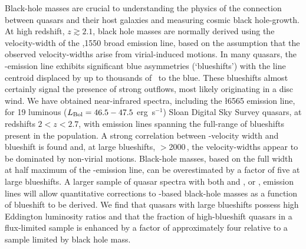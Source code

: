 Black-hole masses are crucial to understanding the physics of the connection between quasars and their host galaxies and measuring cosmic black hole-growth. 
At high redshift, $z \gtrsim 2.1$, black hole masses are normally derived using the velocity-width of the ,1550 broad emission line, based on the assumption that the observed velocity-widths arise from virial-induced motions.  
In many quasars, the -emission line exhibits significant blue asymmetries (`blueshifts') with the line centroid displaced by up to thousands of \kms\, to the blue. 
These blueshifts almost certainly signal the presence of strong outflows, most likely originating in a disc wind.
We have obtained near-infrared spectra, including the \ha\l6565 emission line, for 19 luminous ($L_{\rm Bol} = 46.5-47.5$ erg~s$^{-1}$) Sloan Digital Sky Survey quasars, at redshifts $2 < z < 2.7$, with  emission lines spanning the full-range of blueshifts present in the population.  
A strong correlation between -velocity width and blueshift is found and, at large blueshifts, $>$2000\,\kms, the velocity-widths appear to be dominated by non-virial motions. 
Black-hole masses, based on the full width at half maximum of the -emission line, can be overestimated by a factor of five at large blueshifts. 
A larger sample of quasar spectra with both  and \hbns, or \hans, emission lines will allow quantitative corrections to -based black-hole masses as a function of blueshift to be derived. 
We find that quasars with large  blueshifts possess high Eddington luminosity ratios and that the fraction of high-blueshift quasars in a flux-limited sample is enhanced by a factor of approximately four relative to a sample limited by black hole mass.    

